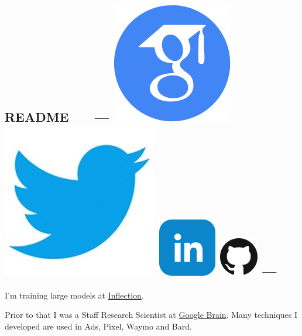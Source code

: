 \documentclass{article}
\begin{document}
\subsection*{README \ \ \ --- \protect
\href{https://scholar.google.com/citations?user=IMkVH_8AAAAJ&hl=en}{\includegraphics[natwidth=22, natheight=22]{img/google-scholar.png}}
\href{https://twitter.com/Hanxiao_6}{\includegraphics[natwidth=22, natheight=22]{img/twitter.jpg}}
\href{https://www.linkedin.com/in/hanxiao-liu-17194a4a/}{\includegraphics[natwidth=22, natheight=22]{img/linkedin.png}}
\href{https://github.com/quark0}{\includegraphics[natwidth=22, natheight=22]{img/GitHub-Mark-64px.png}}
---
}
\noindent I'm training large models at \href{https://inflection.ai}{Inflection}.

\noindent Prior to that I was a Staff Research Scientist at \href{https://ai.google/research/teams/brain}{Google Brain}. Many techniques I developed are used in Ads, Pixel, Waymo and Bard.
\end{document}

